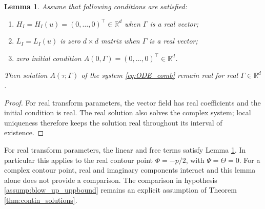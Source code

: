 \documentclass[11pt,a4paper] {article}
\newtheorem{lemma}{Lemma}[section]
\begin{document}
\begin{lemma}\label{lemm:real_sol}
Assume that following conditions are satisfied:
\begin{enumerate}%
\item\label{assump:zero_im_freeterm} $H_I=H_I(u)=(0,\ldots,0)^\top \in \mathbb{R}^d$ when $\Gamma$ is a real vector;
\item\label{assump:zero_im_linterm} $L_I=L_I(u)$ is zero $d\times d$ matrix when $\Gamma$ is a real vector;
\item\label{assump:zero_init_cond} zero initial condition $A(0,\Gamma)=(0,\ldots,0)^\top \in \mathbb{R}^d$.
\end{enumerate}
Then solution $A(\tau; \Gamma)$ of the system \eqref{eq:ODE_comb} remain real for real $\Gamma\in\mathbb{R}^d$. 
\end{lemma}
\begin{proof}
For real transform parameters, the vector field has real coefficients and the initial condition is real. The real solution also solves the complex system; local uniqueness therefore keeps the solution real throughout its interval of existence.
\end{proof}


For real transform parameters, the linear and free terms satisfy
Lemma \ref{lemm:real_sol}. In particular this applies to the real contour point
$\Phi=-p/2$, with $\Psi=\Theta=0$. For a complex contour point, real and
imaginary components interact and this lemma alone does not provide a comparison.
The comparison in hypothesis \ref{assump:blow_up_uppbound} remains an explicit
assumption of Theorem \ref{thm:contin_solutions}.
\end{document}
